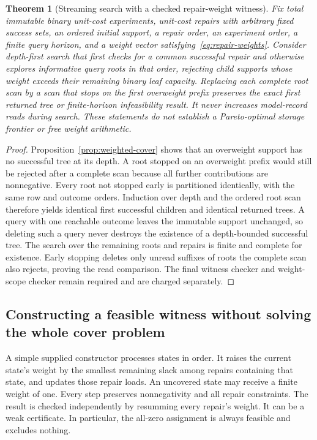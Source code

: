 \documentclass[11pt,letterpaper]{article}
\theoremstyle{plain}
\newtheorem{theorem}{Theorem}[section]
\theoremstyle{definition}
\begin{document}
\begin{theorem}[Streaming search with a checked repair-weight witness]\label{thm:weighted-streaming}
Fix total immutable binary unit-cost experiments, unit-cost repairs with arbitrary fixed success sets, an ordered initial support, a repair order, an experiment order, a finite query horizon, and a weight vector satisfying~\eqref{eq:repair-weights}. Consider depth-first search that first checks for a common successful repair and otherwise explores informative query roots in that order, rejecting child supports whose weight exceeds their remaining binary leaf capacity. Replacing each complete root scan by a scan that stops on the first overweight prefix preserves the exact first returned tree or finite-horizon infeasibility result. It never increases model-record reads during search. These statements do not establish a Pareto-optimal storage frontier or free weight arithmetic.
\end{theorem}
\begin{proof}
Proposition~\ref{prop:weighted-cover} shows that an overweight support has no successful tree at its depth. A root stopped on an overweight prefix would still be rejected after a complete scan because all further contributions are nonnegative. Every root not stopped early is partitioned identically, with the same row and outcome orders. Induction over depth and the ordered root scan therefore yields identical first successful children and identical returned trees. A query with one reachable outcome leaves the immutable support unchanged, so deleting such a query never destroys the existence of a depth-bounded successful tree. The search over the remaining roots and repairs is finite and complete for existence. Early stopping deletes only unread suffixes of roots the complete scan also rejects, proving the read comparison. The final witness checker and weight-scope checker remain required and are charged separately.
\end{proof}

\subsection{Constructing a feasible witness without solving the whole cover problem}
A simple supplied constructor processes states in order. It raises the current state's weight by the smallest remaining slack among repairs containing that state, and updates those repair loads. An uncovered state may receive a finite weight of one. Every step preserves nonnegativity and all repair constraints. The result is checked independently by resumming every repair's weight. It can be a weak certificate. In particular, the all-zero assignment is always feasible and excludes nothing.
\end{document}

